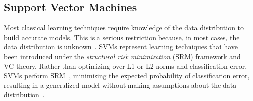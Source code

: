 \documentclass[preprint,12pt]{elsarticle}
\begin{document}
\subsection{Support Vector Machines}\label{subsec:svms}
Most classical learning techniques require knowledge of the data distribution to build accurate models. This is a serious restriction because, in most cases, the data distribution is unknown~\citep{Kecman2001}. SVMs represent learning techniques that have been introduced under the \textit{structural risk minimization} (SRM) framework and VC theory. Rather than optimizing over L1 or L2 norms and classification error, SVMs perform SRM~\citep{Shalev2014}, minimizing the expected probability of classification error, resulting in a generalized model without making assumptions about the data distribution~\citep{Cortes1995}. 
\end{document}
